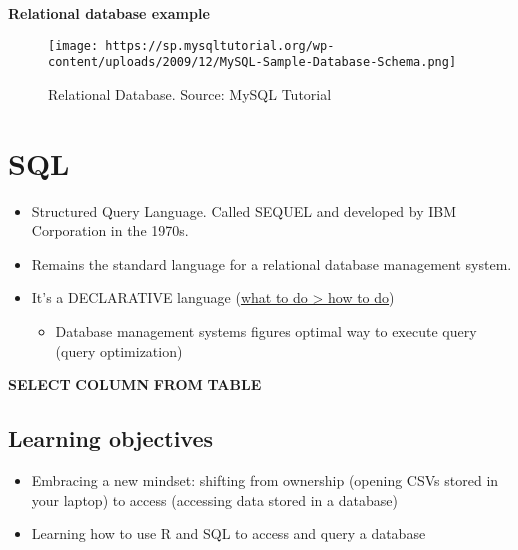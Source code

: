 \documentclass[
]{book}
\newenvironment{Shaded}{\begin{snugshade}}{\end{snugshade}}
\newcommand{\KeywordTok}[1]{\textcolor[rgb]{0.13,0.29,0.53}{\textbf{#1}}}
\providecommand{\tightlist}{%
  \setlength{\itemsep}{0pt}\setlength{\parskip}{0pt}}
\begin{document}
\textbf{Relational database example}

\begin{figure}
\centering
\texttt{[image: https://sp.mysqltutorial.org/wp-content/uploads/2009/12/MySQL-Sample-Database-Schema.png]}
\caption{Relational Database. Source: MySQL Tutorial}
\end{figure}

\hypertarget{sql}{%
\section{SQL}\label{sql}}

\begin{itemize}
\item
  Structured Query Language. Called SEQUEL and developed by IBM Corporation in the 1970s.
\item
  Remains the standard language for a relational database management system.
\item
  It's a DECLARATIVE language (\href{https://www.sqlite.org/queryplanner.html}{what to do \textgreater{} how to do})

  \begin{itemize}
  \tightlist
  \item
    Database management systems figures optimal way to execute query (query optimization)
  \end{itemize}
\end{itemize}

\begin{Shaded}
\begin{Highlighting}[]
\KeywordTok{SELECT} \KeywordTok{COLUMN} \KeywordTok{FROM} \KeywordTok{TABLE} 
\end{Highlighting}
\end{Shaded}

\hypertarget{learning-objectives}{%
\subsection{Learning objectives}\label{learning-objectives}}

\begin{itemize}
\item
  Embracing a new mindset: shifting from ownership (opening CSVs stored in your laptop) to access (accessing data stored in a database)
\item
  Learning how to use R and SQL to access and query a database
\end{itemize}
\end{document}
